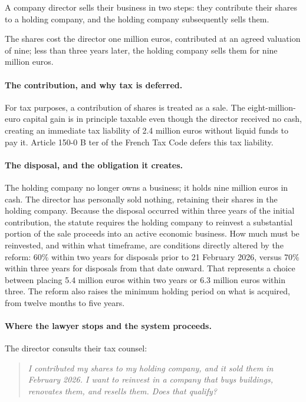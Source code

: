 \documentclass{IOS-Book-Article}
\begin{document}
A company director sells their business in two steps: they contribute their shares to a holding company, and the holding company subsequently sells them.

The shares cost the director one million euros, contributed at an agreed valuation of nine; less than three years later, the holding company sells them for nine million euros.

\paragraph{The contribution, and why tax is deferred.}

For tax purposes, a contribution of shares is treated as a sale. The eight-million-euro capital gain is in principle taxable even though the director received no cash, creating an immediate tax liability of 2.4 million euros without liquid funds to pay it. Article 150-0 B ter of the French Tax Code defers this tax liability.

\paragraph{The disposal, and the obligation it creates.}

The holding company no longer owns a business; it holds nine million euros in cash. The director has personally sold nothing, retaining their shares in the holding company. Because the disposal occurred within three years of the initial contribution, the statute requires the holding company to reinvest a substantial portion of the sale proceeds into an active economic business. How much must be reinvested, and within what timeframe, are conditions directly altered by the reform: 60\% within two years for disposals prior to 21 February 2026, versus 70\% within three years for disposals from that date onward. That represents a choice between placing 5.4 million euros within two years or 6.3 million euros within three. The reform also raises the minimum holding period on what is acquired, from twelve months to five years.

\paragraph{Where the lawyer stops and the system proceeds.}

The director consults their tax counsel:

\begin{quote}
\emph{I contributed my shares to my holding company, and it sold them in February 2026. I want to reinvest in a company that buys buildings, renovates them, and resells them. Does that qualify?}
\end{quote}
\end{document}
